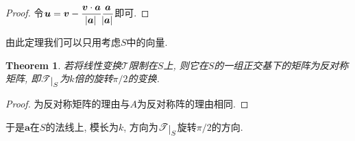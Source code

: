 \documentclass[a4paper,12pt]{ctexart}
\newtheorem{theorem}{Theorem}[section]
\theoremstyle{plain}
\theoremstyle{plain}
\theoremstyle{plain}
\theoremstyle{nonumberplain}
\newtheorem{proof}{Proof}
\newcommand{\restrict}[1]{\raisebox{-.5ex}{$|$}_{#1}}
\newcommand{\vect}[1]{\bm{#1}}
\newcommand{\lntr}[1]{\mathscr{#1}}
\begin{document}
    \begin{proof}
        令$\displaystyle\vect{u}=\vect{v}-
        \frac{\vect{v}\cdot\vect{a}}{\abs{\vect{a}}}
        \frac{\vect{a}}{\abs{\vect{a}}}$即可.
    \end{proof}

    由此定理我们可以只用考虑$S$中的向量.

    \begin{theorem}
        若将线性变换$\lntr{T}$限制在$S$上,
        则它在$S$的一组正交基下的矩阵为反对称矩阵,
        即$\lntr{T}\restrict{S}$为$k$倍的旋转$\pi/2$的变换.
    \end{theorem}

    \begin{proof}
        为反对称矩阵的理由与$A$为反对称阵的理由相同.
    \end{proof}

    于是$\vect{a}$在$S$的法线上, 模长为$k$,
    方向为$\lntr{T}\restrict{S}$旋转$\pi/2$的方向.
\end{document}
